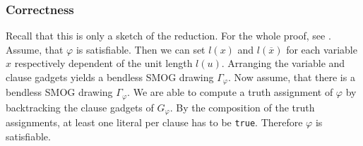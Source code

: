 \begin{sketch}
	\subsubsection*{Correctness}
		Recall that this is only a sketch of the reduction. For the whole proof, see \cite{SMOcti_rel}.\\Assume, that $\varphi$ is satisfiable. Then we can set $l(x)$ and $l(\overline{x})$ for each variable $x$ respectively dependent of the unit length $l(u)$. Arranging the variable and clause gadgets yields a bendless SMOG drawing $\Gamma_\varphi$. Now assume, that there is a bendless SMOG drawing $\Gamma_\varphi$. We are able to compute a truth assignment of $\varphi$ by backtracking the clause gadgets of $G_\varphi$. By the composition of the truth assignments, at least one literal per clause has to be \texttt{true}. Therefore $\varphi$ is satisfiable.
\end{sketch}
